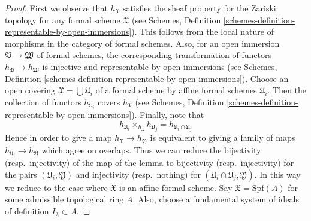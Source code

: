 \documentclass{stacks-project}
\theoremstyle{plain}
\theoremstyle{definition}
\theoremstyle{remark}
\numberwithin{equation}{subsection}
\begin{document}
\begin{proof}
First we observe that $h_\mathfrak X$ satisfies the sheaf property for
the Zariski topology for any formal scheme $\mathfrak X$ (see
Schemes, Definition \ref{schemes-definition-representable-by-open-immersions}).
This follows from the local nature of morphisms in the category
of formal schemes. Also, for an open immersion
$\mathfrak V \to \mathfrak W$ of formal schemes,
the corresponding transformation of functors $h_\mathfrak V \to h_\mathfrak W$
is injective and representable by open immersions (see
Schemes, Definition \ref{schemes-definition-representable-by-open-immersions}).
Choose an open covering $\mathfrak X = \bigcup \mathfrak U_i$
of a formal scheme by affine formal schemes $\mathfrak U_i$.
Then the collection of functors
$h_{\mathfrak U_i}$ covers $h_\mathfrak X$ (see
Schemes, Definition \ref{schemes-definition-representable-by-open-immersions}).
Finally, note that
$$
h_{\mathfrak U_i} \times_{h_\mathfrak X} h_{\mathfrak U_j} =
h_{\mathfrak U_i \cap \mathfrak U_j}
$$
Hence in order to give a map $h_\mathfrak X \to h_\mathfrak Y$
is equivalent to giving a family of maps
$h_{\mathfrak U_i} \to h_\mathfrak Y$ which agree on overlaps.
Thus we can reduce the bijectivity (resp.\ injectivity) of the map
of the lemma to bijectivity (resp.\ injectivity) for the pairs
$(\mathfrak U_i, \mathfrak Y)$
and injectivity (resp.\ nothing)
for $(\mathfrak U_i \cap \mathfrak U_j, \mathfrak Y)$.
In this way we reduce to the case where $\mathfrak X$ is an
affine formal scheme. Say $\mathfrak X = \text{Spf}(A)$
for some admissible topological ring $A$. Also, choose a
fundamental system of ideals of definition $I_\lambda \subset A$.


\end{proof}
\end{document}
